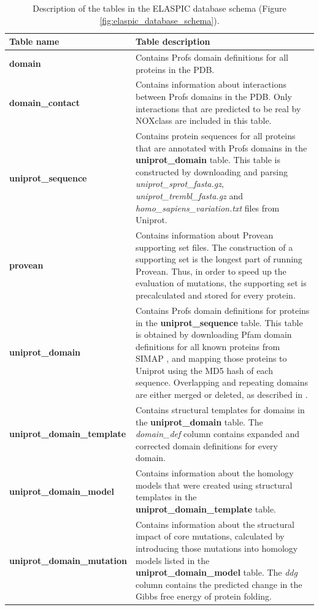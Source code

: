 \begin{table}[!tb]
\caption[ELASPIC database schema.]{Description of the tables in the ELASPIC database schema (Figure \ref{fig:elaspic_database_schema}).} \label{tab:elaspic_database_schema}
\begin{tabular}{l | p{10cm}}
	\toprule
	Table name & Table description \\
	\midrule
	\textbf{domain} & Contains Profs domain definitions for all proteins in the PDB. \\
	\textbf{domain\_contact} & Contains information about interactions between Profs domains in the PDB. Only interactions that are predicted to be real by NOXclass \cite{zhu_noxclass:_2006} are included in this table. \\
	\textbf{uniprot\_sequence} & Contains protein sequences for all proteins that are annotated with Profs domains in the \textbf{uniprot\_domain} table. This table is constructed by downloading and parsing \textit{uniprot\_sprot\_fasta.gz}, \textit{uniprot\_trembl\_fasta.gz} and \textit{homo\_sapiens\_variation.txt} files from Uniprot. \\
	\textbf{provean} & Contains information about Provean \cite{choi_predicting_2012} supporting set files. The construction of a supporting set is the longest part of running Provean. Thus, in order to speed up the evaluation of mutations, the supporting set is precalculated and stored for every protein. \\
	\textbf{uniprot\_domain} & Contains Profs domain definitions for proteins in the \textbf{uniprot\_sequence} table. This table is obtained by downloading Pfam domain definitions for all known proteins from SIMAP \cite{rattei_simapcomprehensive_2010}, and mapping those proteins to Uniprot using the MD5 hash of each sequence. Overlapping and repeating domains are either merged or deleted, as described in \cite{witvliet_elaspic_2016}. \\
	\textbf{uniprot\_domain\_template} & Contains structural templates for domains in the \textbf{uniprot\_domain} table. The \textit{domain\_def} column contains expanded and corrected domain definitions for every domain. \\
	\textbf{uniprot\_domain\_model} & Contains information about the homology models that were created using structural templates in the \textbf{uniprot\_domain\_template} table. \\
	\textbf{uniprot\_domain\_mutation} & Contains information about the structural impact of core mutations, calculated by introducing those mutations into homology models listed in the \textbf{uniprot\_domain\_model} table. The \textit{ddg} column contains the predicted change in the Gibbs free energy of protein folding. \\

\end{tabular}
\end{table}
